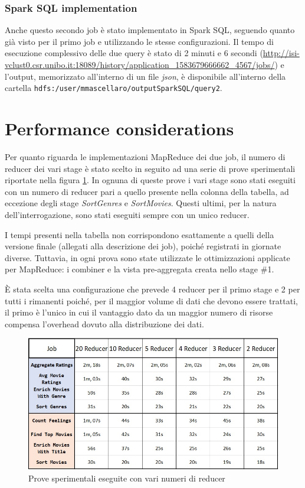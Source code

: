 \documentclass[10pt]{article}
\begin{document}
\subsubsection{Spark SQL implementation}

Anche questo secondo job è stato implementato in Spark SQL, seguendo quanto già visto per il primo job e utilizzando le stesse configurazioni. Il tempo di esecuzione complessivo delle due query è stato di 2 minuti e 6 secondi (\url{http://isi-vclust0.csr.unibo.it:18089/history/application_1583679666662_4567/jobs/}) e l'output, memorizzato all'interno di un file \textit{json}, è disponibile all'interno della cartella \texttt{hdfs:/user/mmascellaro/outputSparkSQL/query2}.

\section{Performance considerations}

Per quanto riguarda le implementazioni MapReduce dei due job, il numero di reducer dei vari stage è stato scelto in seguito ad una serie di prove sperimentali riportate nella figura \ref{PerformanceMapReduce1}. In ognuna di queste prove i vari stage sono stati eseguiti con un numero di reducer pari a quello presente nella colonna della tabella, ad eccezione degli stage \textit{SortGenres} e \textit{SortMovies}. Questi ultimi, per la natura dell'interrogazione, sono stati eseguiti sempre con un unico reducer.

I tempi presenti nella tabella non corrispondono esattamente a quelli della versione finale (allegati alla descrizione dei job), poiché registrati in giornate diverse. Tuttavia, in ogni prova sono state utilizzate le ottimizzazioni applicate per MapReduce: i combiner e la vista pre-aggregata creata nello stage \#1.

È stata scelta una configurazione che prevede 4 reducer per il primo stage e 2 per tutti i rimanenti poiché, per il maggior volume di dati che devono essere trattati, il primo è l'unico in cui il vantaggio dato da un maggior numero di risorse compensa l'overhead dovuto alla distribuzione dei dati.

\begin{figure}[th]
	\centering
	\includegraphics[scale=0.78]{images/PerformanceMapReduce1.jpg}
	\caption{Prove sperimentali eseguite con vari numeri di reducer}
	\label{PerformanceMapReduce1}
\end{figure}
\end{document}
